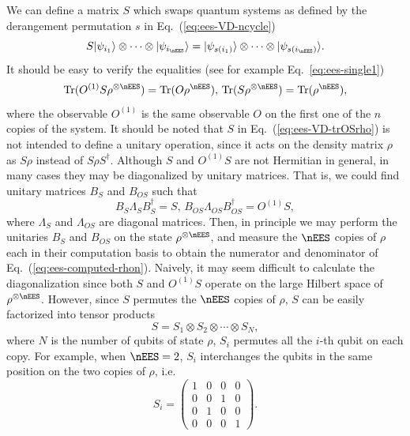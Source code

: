 We can define a matrix $S$ which swaps quantum systems as defined by the derangement permutation
$s$ in Eq.~(\ref{eq:ees-VD-ncycle})
\begin{equation}
    \label{eq:ees-derangement-matrix-S}
    S | \psi _{i_1} \rangle \otimes \cdots \otimes | \psi _{i_\nEES} \rangle
    = |\psi _{s ( i_{1})} \rangle \otimes \cdots \otimes |\psi _{s ( i_{\nEES})} \rangle.
\end{equation}
It should be easy to verify the equalities (see for example Eq.~\ref{eq:ees-single1})
\begin{equation}
    \label{eq:ees-VD-trOSrho}
    \mathrm{Tr}(O^{(1)} S \rho^{\otimes \nEES}) = \mathrm{Tr}(O \rho^\nEES),\,
    \mathrm{Tr}(S \rho^{\otimes \nEES}) = \mathrm{Tr}(\rho^\nEES), 
\end{equation}
where the observable $O^{(1)}$ is the same observable $O$ on the first one of the $n$ copies of the system.
It should be noted that $S$ in Eq.~(\ref{eq:ees-VD-trOSrho}) is not intended to define a unitary operation,
since it acts on the density matrix $\rho$ as $S\rho$ instead of $S\rho S^\dagger$.
Although $S$ and $O^{(1)}S$ are not Hermitian in general, in many cases they may be diagonalized by unitary matrices.
That is, we could find unitary matrices $B_S$ and $B_{OS}$ such that
\begin{equation}
    \label{eq:ees-sym-diag-gates}
    B_S \Lambda_S B_S^\dagger = S,\, B_{OS} \Lambda_{OS} B_{OS}^\dagger = O^{(1)} S,
\end{equation}
where $\Lambda_S$ and $\Lambda_{OS}$ are diagonal matrices.
Then, in principle we may perform the unitaries $B_S$ and $B_{OS}$ on the state $\rho^{\otimes \nEES}$,
and measure the $\nEES$ copies of $\rho$ each in their computation basis to obtain the numerator and denominator of
Eq.~(\ref{eq:ees-computed-rhon}). Naively, it may seem difficult to calculate the diagonalization since both $S$ and $O^{(1)}S$ operate on the large Hilbert space of $\rho^{\otimes \nEES}$. However, since $S$ permutes the $\nEES$ copies of $\rho$,
$S$ can be easily factorized into tensor products
\begin{equation}
    S = S_1 \otimes S_2 \otimes \cdots \otimes S_N,
\end{equation}
where $N$ is the number of qubits of state $\rho$, $S_{i}$ permutes all the $i$-th qubit on each copy.
For example, when $\nEES=2$, $S_i$ interchanges the qubits in the same position on the two copies of $\rho$,
i.e.
\begin{equation}
    S_i = \begin{pmatrix}
        1 & 0 & 0 & 0 \\ 0& 0& 1& 0\\ 0& 1& 0& 0\\ 0& 0& 0& 1
    \end{pmatrix}.
\end{equation}

